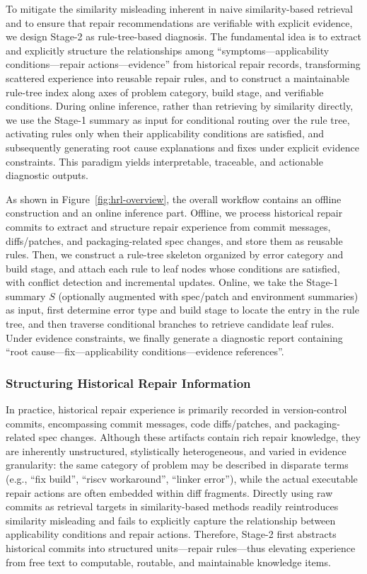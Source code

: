 \documentclass[sigconf,anonymous]{acmart}
\begin{document}
To mitigate the similarity misleading inherent in naive similarity-based retrieval and to ensure that repair recommendations are verifiable with explicit evidence, we design Stage-2 as rule-tree-based diagnosis. The fundamental idea is to extract and explicitly structure the relationships among ``symptoms---applicability conditions---repair actions---evidence'' from historical repair records, transforming scattered experience into reusable repair rules, and to construct a maintainable rule-tree index along axes of problem category, build stage, and verifiable conditions. During online inference, rather than retrieving by similarity directly, we use the Stage-1 summary as input for conditional routing over the rule tree, activating rules only when their applicability conditions are satisfied, and subsequently generating root cause explanations and fixes under explicit evidence constraints. This paradigm yields interpretable, traceable, and actionable diagnostic outputs.

As shown in Figure~\ref{fig:hrl-overview}, the overall workflow contains an offline construction and an online inference part. Offline, we process historical repair commits to extract and structure repair experience from commit messages, diffs/patches, and packaging-related spec changes, and store them as reusable rules. Then, we construct a rule-tree skeleton organized by error category and build stage, and attach each rule to leaf nodes whose conditions are satisfied, with conflict detection and incremental updates. Online, we take the Stage-1 summary $S$ (optionally augmented with spec/patch and environment summaries) as input, first determine error type and build stage to locate the entry in the rule tree, and then traverse conditional branches to retrieve candidate leaf rules. Under evidence constraints, we finally generate a diagnostic report containing ``root cause---fix---applicability conditions---evidence references''.

\subsubsection{Structuring Historical Repair Information}

In practice, historical repair experience is primarily recorded in version-control commits, encompassing commit messages, code diffs/patches, and packaging-related spec changes. Although these artifacts contain rich repair knowledge, they are inherently unstructured, stylistically heterogeneous, and varied in evidence granularity: the same category of problem may be described in disparate terms (e.g., ``fix build'', ``riscv workaround'', ``linker error''), while the actual executable repair actions are often embedded within diff fragments. Directly using raw commits as retrieval targets in similarity-based methods readily reintroduces similarity misleading and fails to explicitly capture the relationship between applicability conditions and repair actions. Therefore, Stage-2 first abstracts historical commits into structured units---repair rules---thus elevating experience from free text to computable, routable, and maintainable knowledge items.
\end{document}
